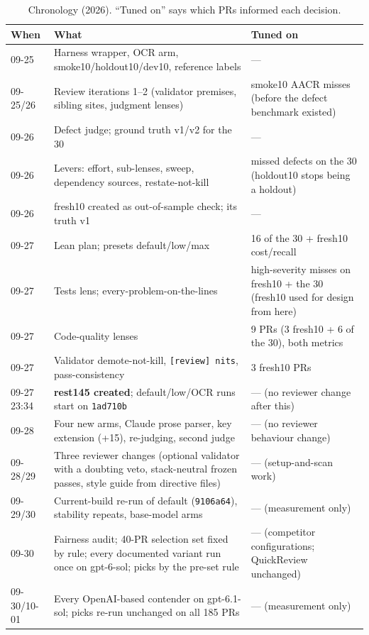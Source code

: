 \documentclass[11pt,a4paper]{article}
\newcommand{\qcr}{QuickReview}
\newcommand{\code}[1]{\texttt{#1}}
\begin{document}
\begin{table}[h]
  \centering
  \small
  \caption{Chronology (2026). ``Tuned on'' says which PRs informed each
  decision.}
  \label{tab:chron}
  \begin{tabularx}{\textwidth}{l X X}
    \toprule
    When & What & Tuned on \\
    \midrule
    09-25 & Harness wrapper, OCR arm, smoke10/holdout10/dev10, reference labels & --- \\
    09-25/26 & Review iterations 1--2 (validator premises, sibling sites, judgment lenses) & smoke10 AACR misses (before the defect benchmark existed) \\
    09-26 & Defect judge; ground truth v1/v2 for the 30 & --- \\
    09-26 & Levers: effort, sub-lenses, sweep, dependency sources, restate-not-kill & missed defects on the 30 (holdout10 stops being a holdout) \\
    09-26 & fresh10 created as out-of-sample check; its truth v1 & --- \\
    09-27 & Lean plan; presets default/low/max & 16 of the 30 + fresh10 cost/recall \\
    09-27 & Tests lens; every-problem-on-the-lines & high-severity misses on fresh10 + the 30 (fresh10 used for design from here) \\
    09-27 & Code-quality lenses & 9 PRs (3 fresh10 + 6 of the 30), both metrics \\
    09-27 & Validator demote-not-kill, \code{[review] nits}, pass-consistency & 3 fresh10 PRs \\
    09-27 23:34 & \textbf{rest145 created}; default/low/OCR runs start on \code{1ad710b} & --- (no reviewer change after this) \\
    09-28 & Four new arms, Claude prose parser, key extension (+15), re-judging, second judge & --- (no reviewer behaviour change) \\
    09-28/29 & Three reviewer changes (optional validator with a doubting veto, stack-neutral frozen passes, style guide from directive files) & --- (setup-and-scan work) \\
    09-29/30 & Current-build re-run of default (\code{9106a64}), stability repeats, base-model arms & --- (measurement only) \\
    09-30 & Fairness audit; 40-PR selection set fixed by rule; every documented variant run once on gpt-6-sol; picks by the pre-set rule & --- (competitor configurations; \qcr{} unchanged) \\
    09-30/10-01 & Every OpenAI-based contender on gpt-6.1-sol; picks re-run unchanged on all 185 PRs & --- (measurement only) \\
    \bottomrule
  \end{tabularx}
\end{table}
\end{document}
